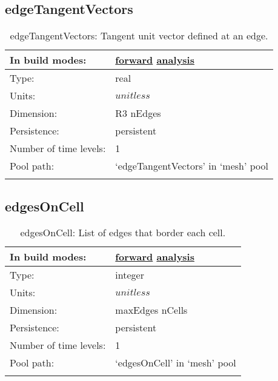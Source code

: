 \subsection[edgeTangentVectors]{edgeTangentVectors}
\label{subsec:var_sec_mesh_edgeTangentVectors}
\begin{center}
\begin{longtable}{| p{2.0in} | p{4.0in} |}
        \hline 
        In build modes: & \hyperref[subsec:forward_var_tab_mesh]{forward} \hyperref[subsec:analysis_var_tab_mesh]{analysis} \\
        \hline 
        Type: & real \\
        \hline 
        Units: & $unitless$ \\
        \hline 
        Dimension: & R3 nEdges \\
        \hline 
        Persistence: & persistent \\
        \hline 
        Number of time levels: & 1 \\
        \hline 
            Pool path: & `edgeTangentVectors' in `mesh' pool \\
		 \hline 
    \caption{edgeTangentVectors: Tangent unit vector defined at an edge.}
\end{longtable}
\end{center}
\subsection[edgesOnCell]{edgesOnCell}
\label{subsec:var_sec_mesh_edgesOnCell}
\begin{center}
\begin{longtable}{| p{2.0in} | p{4.0in} |}
        \hline 
        In build modes: & \hyperref[subsec:forward_var_tab_mesh]{forward} \hyperref[subsec:analysis_var_tab_mesh]{analysis} \\
        \hline 
        Type: & integer \\
        \hline 
        Units: & $unitless$ \\
        \hline 
        Dimension: & maxEdges nCells \\
        \hline 
        Persistence: & persistent \\
        \hline 
        Number of time levels: & 1 \\
        \hline 
            Pool path: & `edgesOnCell' in `mesh' pool \\
		 \hline 
    \caption{edgesOnCell: List of edges that border each cell.}
\end{longtable}
\end{center}
